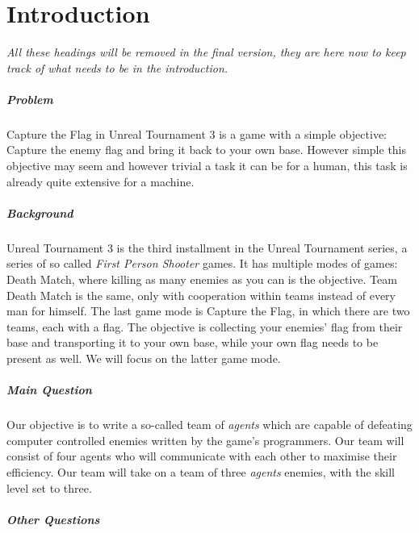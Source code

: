 \chapter{Introduction}
\emph{All these headings will be removed in the final version, they are here now to keep track of what needs to be in the introduction.}

\paragraph{Problem}
Capture the Flag in Unreal Tournament 3 is a game with a simple objective: Capture the enemy flag and bring it back to your own base. However simple this objective may seem and however trivial a task it can be for a human, this task is already quite extensive for a machine.

\paragraph{Background}
Unreal Tournament 3 is the third installment in the Unreal Tournament series, a series of so called \emph{First Person Shooter} games. It has multiple modes of games: Death Match, where killing as many enemies as you can is the objective. Team Death Match is the same, only with cooperation within teams instead of every man for himself. The last game mode is Capture the Flag, in which there are two teams, each with a flag. The objective is collecting your enemies' flag from their base and transporting it to your own base, while your own flag needs to be present as well. We will focus on the latter game mode.

\paragraph{Main Question}
Our objective is to write a so-called team of \emph{agents} which are capable of defeating computer controlled enemies written by the game's programmers. Our team will consist of four agents who will communicate with each other to maximise their efficiency. Our team will take on a team of three \emph{agents} enemies, with the skill level set to three.

\paragraph{Other Questions}

